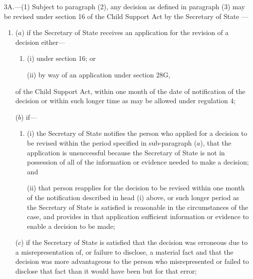 \documentclass[12pt,a4paper]{article}
\begin{document}
3A.---(1)  Subject to paragraph (2), any decision as defined in paragraph (3) may be revised under section 16 of the Child Support Act by the 
Secretary of State%
—
\begin{enumerate}\item[]
($a$) if 
the Secretary of State  %
receives an application for the revision of a decision either—
\begin{enumerate}\item[]
(i) under section 16; or

(ii) by way of an application under section 28G,
\end{enumerate}
of the Child Support Act, within one month of the date of notification of the decision or within such longer time as may be allowed under regulation 4;

($b$) if—
\begin{enumerate}\item[]
(i) 
the Secretary of State  %
notifies the person who applied for a decision to be revised within the period specified in sub-paragraph ($a$), that the application is unsuccessful because the 
Secretary of State  %
is not in possession of all of the information or evidence needed to make a decision; and

(ii) that person reapplies for the decision to be revised within one month of the notification described in head (i)  above, or such longer period as the 
Secretary of State  %
is satisfied is reasonable in the circumstances of the case, and provides in that application sufficient information or evidence to enable a decision to be made;
\end{enumerate}

($c$) if 
the Secretary of State  %
is satisfied that the decision was erroneous due to a misrepresentation of, or failure to disclose, a material fact and that the decision was more advantageous to the person who misrepresented or failed to disclose that fact than it would have been but for that error;


\end{enumerate}
\end{document}
